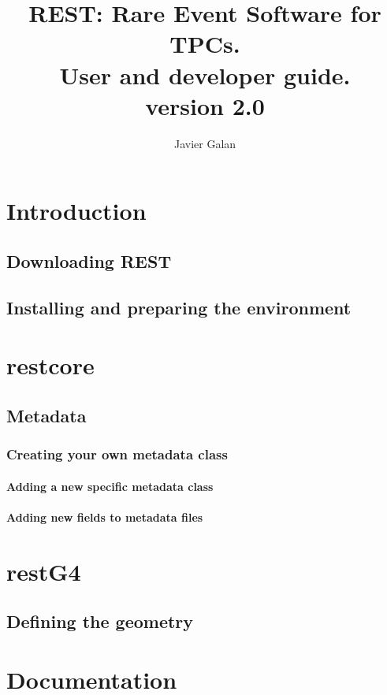 \documentclass[12pt,a4paper]{memoir} %
\title{REST: Rare Event Software for TPCs.\\User and developer guide.\\ version 2.0\\}
\author{Javier Galan}
\newcommand*{\pretoctitle}[1]{{\clearpage\centering
\vspace*{-\topfiddle}#1\par}}
\newcommand{\asuacknowledgements}{\pretoctitle{ACKNOWLEDGEMENTS}}
\begin{document}



\tableofcontents* %
\newpage

\chapter{Introduction}

\section{Downloading REST}

\section{Installing and preparing the environment}

\chapter{restcore}

\section{Metadata}

\subsection{Creating your own metadata class}

\subsubsection{Adding a new specific metadata class}

\subsubsection{Adding new fields to metadata files}

\chapter{restG4}

\section{Defining the geometry}

\chapter{Documentation}
\end{document}
